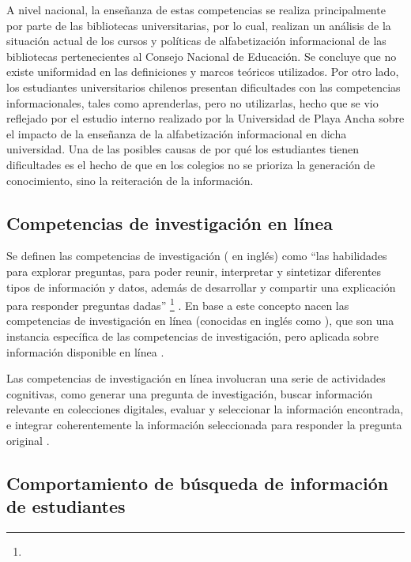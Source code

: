 A nivel nacional, la enseñanza de estas competencias se realiza principalmente por parte de las bibliotecas universitarias, por lo cual, \textcite{marzal2015diagnostico} realizan un análisis de la situación actual de los cursos y políticas de alfabetización informacional de las bibliotecas pertenecientes al Consejo Nacional de Educación. Se concluye que no existe uniformidad en las definiciones y marcos teóricos utilizados. Por otro lado, los estudiantes universitarios chilenos presentan dificultades con las competencias informacionales, tales como aprenderlas, pero no utilizarlas, hecho que se vio reflejado por el estudio interno realizado por la Universidad de Playa Ancha \parencite{urra2016alfabetizacion} sobre el impacto de la enseñanza de la alfabetización informacional en dicha universidad. Una de las posibles causas de por qué los estudiantes tienen dificultades es el hecho de que en los colegios no se prioriza la generación de conocimiento, sino la reiteración de la información.

\subsection{Competencias de investigación en línea}
Se definen las competencias de investigación ( en inglés) como “las habilidades para explorar preguntas, para poder reunir, interpretar y sintetizar diferentes tipos de información y datos, además de desarrollar y compartir una explicación para responder preguntas dadas” \footnote{\traduccionlibre} \parencite[p.~13]{national2000inquiry}. En base a este concepto nacen las competencias de investigación en línea (conocidas en inglés como ), que son una instancia específica de las competencias de investigación, pero aplicada sobre información disponible en línea \parencite{quintana2005framework}.

Las competencias de investigación en línea involucran una serie de actividades cognitivas, como generar una pregunta de investigación, buscar información relevante en colecciones digitales, evaluar y seleccionar la información encontrada, e integrar coherentemente la información seleccionada para responder la pregunta original \parencite{eisenberg1990information}.

\subsection{Comportamiento de búsqueda de información de estudiantes}

